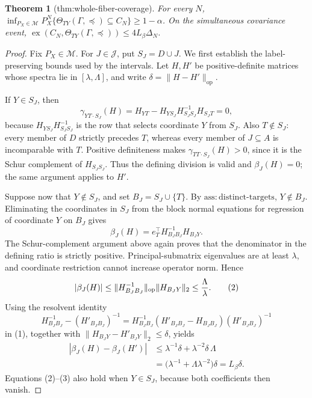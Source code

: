 \documentclass{article}
\newtheorem{theorem}{Theorem}
\begin{document}
\begin{theorem}[thm:whole-fiber-coverage]\label{thm:whole-fiber-coverage}
For every \(N\), \(\inf_{P_X\in\mathcal M}P_X^N\{\Theta_{TY}(\Gamma,\preceq)\subseteq C_N\}\ge1-\alpha\). On the simultaneous covariance event, \(\operatorname{ex}(C_N,\Theta_{TY}(\Gamma,\preceq))\le4L_\beta\Delta_N\).
\end{theorem}
\begin{proof}
Fix \(P_X\in\mathcal M\).  For \(J\in\mathcal J\), put \(S_J=D\cup J\).  We first establish the label-preserving bounds used by the intervals.  Let \(H,H'\) be positive-definite matrices whose spectra lie in \([\lambda,\Lambda]\), and write \(\delta=\|H-H'\|_{\mathrm{op}}\).

If \(Y\in S_J\), then
\[
 \gamma_{YT\cdot S_J}(H)
 =H_{YT}-H_{YS_J}H_{S_JS_J}^{-1}H_{S_JT}=0,
\]
because \(H_{YS_J}H_{S_JS_J}^{-1}\) is the row that selects coordinate \(Y\) from \(S_J\).  Also \(T\notin S_J\): every member of \(D\) strictly precedes \(T\), whereas every member of \(J\subseteq A\) is incomparable with \(T\).  Positive definiteness makes \(\gamma_{TT\cdot S_J}(H)>0\), since it is the Schur complement of \(H_{S_JS_J}\).  Thus the defining division is valid and \(\beta_J(H)=0\); the same argument applies to \(H'\).

Suppose now that \(Y\notin S_J\), and set \(B_J=S_J\cup\{T\}\).  By \(\mathrm{ass:distinct\text{-}targets}\), \(Y\notin B_J\).  Eliminating the coordinates in \(S_J\) from the block normal equations for regression of coordinate \(Y\) on \(B_J\) gives
\[
 \beta_J(H)=e_T^\top H_{B_JB_J}^{-1}H_{B_JY}. \tag{1}
\]
The Schur-complement argument above again proves that the denominator in the defining ratio is strictly positive.  Principal-submatrix eigenvalues are at least \(\lambda\), and coordinate restriction cannot increase operator norm.  Hence
\[
 |\beta_J(H)|
 \le \|H_{B_JB_J}^{-1}\|_{\mathrm{op}}\|H_{B_JY}\|_2
 \le {\Lambda\over\lambda}. \tag{2}
\]
Using the resolvent identity
\[
 H_{B_JB_J}^{-1}-(H'_{B_JB_J})^{-1}
 =H_{B_JB_J}^{-1}(H'_{B_JB_J}-H_{B_JB_J})(H'_{B_JB_J})^{-1}
\]
in (1), together with \(\|H_{B_JY}-H'_{B_JY}\|_2\le\delta\), yields
\[
 \begin{aligned}
 |\beta_J(H)-\beta_J(H')|
 &\le \lambda^{-1}\delta+\lambda^{-2}\delta\,\Lambda\\
 &=\bigl(\lambda^{-1}+\Lambda\lambda^{-2}\bigr)\delta
 =L_\beta\delta. 
 \end{aligned} \tag{3}
\]
Equations (2)--(3) also hold when \(Y\in S_J\), because both coefficients then vanish.


\end{proof}
\end{document}
